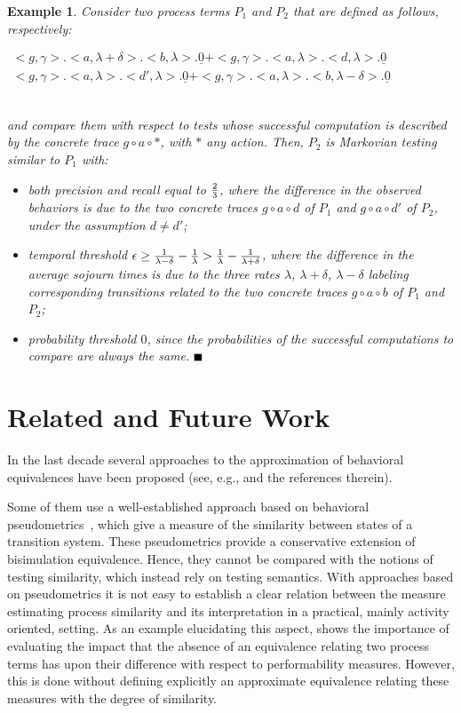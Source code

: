 \documentclass[copyright,creativecommons]{eptcs}
\newtheorem{new_example}
	[new_theorem]{Example}
\newenvironment{example}
	{\begin{new_example}\rm}
	{\end{new_example}}
\newcommand{\cws}[2]
	{\\ \centerline{$#2$} \\[-#1pt]}
\newcommand{\lap}
	{\mbox{$<$}}
\newcommand{\rap}
	{\mbox{$>$}}
\newcommand{\nil}
	{\underline 0}
\newcommand{\fullbox}
	{{\mbox{}\nolinebreak\hfill{$\rule{2mm}{2mm}$}}}
\begin{document}
\begin{example}
Consider two process terms $P_{1}$ and $P_{2}$ that are defined as follows, respectively:
\cws{0}{\begin{array}{l}
\lap g, \gamma \rap . \lap a, \lambda+\delta \rap . \lap b, \lambda \rap . \nil +
\lap g, \gamma \rap . \lap a, \lambda \rap . \lap d, \lambda \rap . \nil \\
\lap g, \gamma \rap . \lap a, \lambda \rap . \lap d', \lambda \rap . \nil +
\lap g, \gamma \rap . \lap a, \lambda \rap . \lap b, \lambda-\delta \rap . \nil 
\end{array}}
and compare them with respect to tests whose successful computation is described by the concrete trace $g \circ a \circ \ast$,
with $\ast$ any action. Then, $P_{2}$ is Markovian testing similar to $P_{1}$ with:
\begin{itemize}
\item both precision and recall equal to $2 \over 3$, where the difference in the observed behaviors is due to the two concrete 
traces $g \circ a \circ d$ of $P_{1}$ and $g \circ a \circ d'$ of $P_{2}$, under the assumption $d \not= d'$; 
\item temporal threshold $\epsilon \ge {1 \over \lambda - \delta} - {1 \over \lambda} > 
{1 \over \lambda} - {1 \over \lambda + \delta}$, where the difference in the average 
sojourn times is due to the three rates $\lambda$, $\lambda+\delta$, $\lambda-\delta$ labeling corresponding transitions
related to the two concrete traces $g \circ a \circ b$ of $P_{1}$ and $P_{2}$; 
\item probability threshold $0$, since the probabilities of the successful computations to compare are always the same.
\fullbox
\end{itemize}
\end{example}

\section{Related and Future Work}\label{sect:conc}

In the last decade several approaches to the approximation of behavioral equivalences have been proposed (see, e.g., 
\cite{LMMS,DGJP,vBW,DHW,AP,AAW,DLT,DHW2} and the references therein). 

Some of them use a well-established approach based on behavioral pseudometrics~\cite{DGJP,vBW}, which give a 
measure of the similarity between states of a transition system. These pseudometrics provide a conservative extension of 
bisimulation equivalence. Hence, they cannot be compared with the notions of testing similarity, which instead rely on testing 
semantics. With approaches based on pseudometrics it is not easy to establish a clear relation between the measure estimating 
process similarity and its interpretation in a practical, mainly activity oriented, setting. 
As an example elucidating this aspect, \cite{AB} shows the importance of evaluating the impact that the absence of an equivalence 
relating two process terms has upon their difference with respect to performability measures. However, this is done without 
defining explicitly an approximate equivalence relating these measures with the degree of similarity. 
\end{document}
